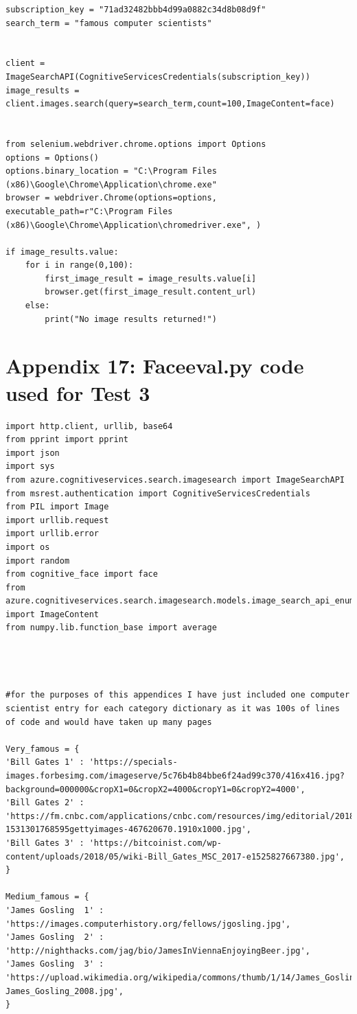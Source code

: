 \documentclass[12pt,a4paper]{article}
\begin{document}
\begin{appendices}
\begin{lstlisting}
subscription_key = "71ad32482bbb4d99a0882c34d8b08d9f"
search_term = "famous computer scientists" 


client = ImageSearchAPI(CognitiveServicesCredentials(subscription_key)) 
image_results = client.images.search(query=search_term,count=100,ImageContent=face)  
   

from selenium.webdriver.chrome.options import Options
options = Options()
options.binary_location = "C:\Program Files (x86)\Google\Chrome\Application\chrome.exe"
browser = webdriver.Chrome(options=options, executable_path=r"C:\Program Files (x86)\Google\Chrome\Application\chromedriver.exe", )

if image_results.value: 
    for i in range(0,100):
        first_image_result = image_results.value[i]
        browser.get(first_image_result.content_url)
    else:
        print("No image results returned!") 
\end{lstlisting}
\section{Appendix 17: Face\textunderscore eval.py code used for Test 3}  
\begin{lstlisting}
import http.client, urllib, base64
from pprint import pprint 
import json
import sys 
from azure.cognitiveservices.search.imagesearch import ImageSearchAPI
from msrest.authentication import CognitiveServicesCredentials  
from PIL import Image 
import urllib.request  
import urllib.error
import os  
import random
from cognitive_face import face
from azure.cognitiveservices.search.imagesearch.models.image_search_api_enums import ImageContent
from numpy.lib.function_base import average




#for the purposes of this appendices I have just included one computer scientist entry for each category dictionary as it was 100s of lines of code and would have taken up many pages

Very_famous = { 
'Bill Gates 1' : 'https://specials-images.forbesimg.com/imageserve/5c76b4b84bbe6f24ad99c370/416x416.jpg?background=000000&cropX1=0&cropX2=4000&cropY1=0&cropY2=4000',
'Bill Gates 2' : 'https://fm.cnbc.com/applications/cnbc.com/resources/img/editorial/2018/07/11/105322791-1531301768595gettyimages-467620670.1910x1000.jpg',
'Bill Gates 3' : 'https://bitcoinist.com/wp-content/uploads/2018/05/wiki-Bill_Gates_MSC_2017-e1525827667380.jpg',
}  

Medium_famous = { 
'James Gosling  1' : 'https://images.computerhistory.org/fellows/jgosling.jpg',
'James Gosling  2' : 'http://nighthacks.com/jag/bio/JamesInViennaEnjoyingBeer.jpg',
'James Gosling  3' : 'https://upload.wikimedia.org/wikipedia/commons/thumb/1/14/James_Gosling_2008.jpg/220px-James_Gosling_2008.jpg',
}  


\end{lstlisting}
\end{appendices}
\end{document}
